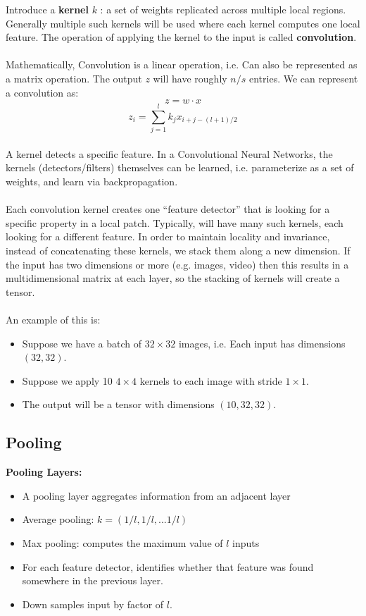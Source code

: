 \documentclass[12pt, a4paper]{book}
\begin{document}
Introduce a \textbf{kernel} $k$ : a set of weights replicated across multiple local regions. Generally multiple such kernels will be used where each kernel computes one local feature. The operation of applying the kernel to the input is called \textbf{convolution}.\\\\
Mathematically, Convolution is a linear operation, i.e. Can also be represented as a matrix operation. The output $z$ will have roughly $n/s$ entries. We can represent a convolution as:
$$z = w\cdot x$$
$$z_i = \sum^l_{j=1}k_jx_{i+j-(l+1)/2}$$\\
A kernel detects a specific feature. In a Convolutional Neural Networks, the kernels (detectors/filters) themselves can be learned, i.e. parameterize as a set of weights, and learn via backpropagation.\\\\
Each convolution kernel creates one “feature detector” that is looking for a specific property in a local patch. Typically, will have many such kernels, each looking for a different feature. In order to maintain locality and invariance, instead of concatenating these kernels, we stack them along a new dimension. If the input has two dimensions or more (e.g. images, video) then this results in a multidimensional matrix at each layer, so the stacking of kernels will create a tensor.\\\\
An example of this is:
\begin{itemize}
    \item Suppose we have a batch of $32\times 32$ images, i.e. Each input has dimensions $(32, 32)$.
    \item  Suppose we apply 10 $4\times4$ kernels to each
image with stride $1\times1$.
    \item The output will be a tensor with dimensions $(10, 32, 32)$.\\
\end{itemize}

\subsection{Pooling}

\textbf{Pooling Layers:}
\begin{itemize}
    \item A pooling layer aggregates information from an adjacent layer
    \item Average pooling: $k=(1/l, 1/l,...1/l)$
    \item Max pooling: computes the maximum value of
$l$ inputs
    \item For each feature detector, identifies whether that feature was found somewhere in the previous layer.
    \item Down samples input by factor of $l$.
\end{itemize}
\end{document}
